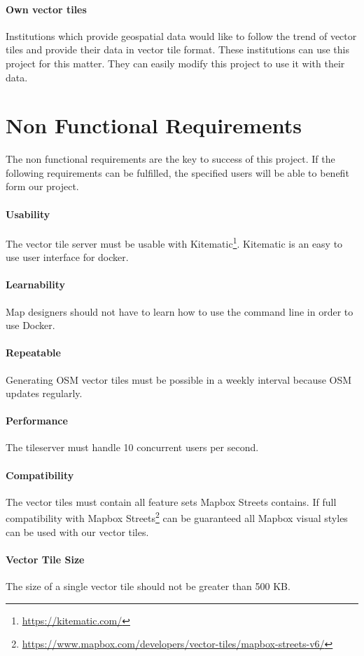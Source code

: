 \paragraph{Own vector tiles}
Institutions which provide geospatial data would like to follow the trend of vector tiles and provide their data in vector tile format. These institutions can use this project for this matter. They can easily modify this project to use it with their data. 

\section{Non Functional Requirements}\label{non_functional_requirements}

The non functional requirements are the key to success of this project. If the following requirements can be fulfilled, the specified users will be able to benefit form our project.

\paragraph{Usability}
The vector tile server must be usable with Kitematic\footnote{\url{https://kitematic.com/}}. Kitematic is an easy to use user interface for docker. 

\paragraph{Learnability}

Map designers should not have to learn how to use the command line in
order to use Docker.

\paragraph{Repeatable}

Generating OSM vector tiles must be possible in a weekly interval because OSM
updates regularly.

\paragraph{Performance}

The tileserver must handle 10 concurrent users per second.

\paragraph{Compatibility}

The vector tiles must contain all feature sets Mapbox Streets contains. If full compatibility with Mapbox Streets\footnote{\url{https://www.mapbox.com/developers/vector-tiles/mapbox-streets-v6/}} can be guaranteed all Mapbox visual styles can be used with our vector tiles.

\paragraph{Vector Tile Size}

The size of a single vector tile should not be greater than 500 KB.
